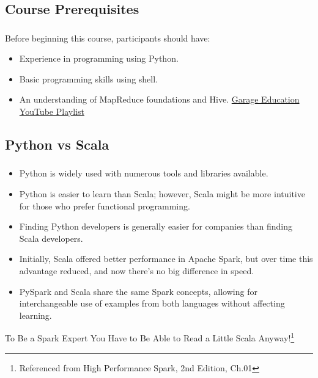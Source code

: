\subsection{Course Prerequisites}\label{subsec:course-prerequisites}
\begin{frame}
    \frametitle{\subsecname}
    Before beginning this course, participants should have:
    \begin{itemize}
        \item Experience in programming using Python.
        \item Basic programming skills using shell.
        \item An understanding of MapReduce foundations and Hive. \href{https://www.youtube.com/playlist?list=PLxNoJq6k39G8Ak39PDC-oYvp6ZRvIn3Pa}{Garage Education YouTube Playlist}
    \end{itemize}

\end{frame}



\subsection{Python vs Scala}\label{subsec:python-vs-scala}
\begin{frame}
    \frametitle{\subsecname}
    \begin{itemize}
        \item Python is widely used with numerous tools and libraries available.
        \item Python is easier to learn than Scala; however, Scala might be more intuitive for those who prefer functional programming.
        \item Finding Python developers is generally easier for companies than finding Scala developers.
        \item Initially, Scala offered better performance in Apache Spark, but over time this advantage reduced, and now there's no big difference in speed.
        \item PySpark and Scala share the same Spark concepts, allowing for interchangeable use of examples from both languages without affecting learning.
    \end{itemize}
\end{frame}

\begin{frame}
    \begin{center}
        \begin{tcolorbox}[colback=blue!5!white,colframe=blue!75!black,title=Attention!]
            To Be a Spark Expert You Have to Be Able to Read a Little Scala Anyway!\footnote{Referenced from High Performance Spark, 2nd Edition, Ch.01}
        \end{tcolorbox}
    \end{center}

\end{frame}

